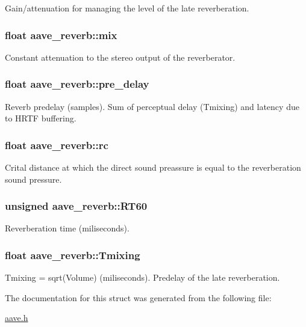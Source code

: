 Gain/attenuation for managing the level of the late reverberation. \hypertarget{structaave__reverb_a1d02d0947a2ba910470d895e03e210d4}{
\subsubsection[{mix}]{\setlength{\rightskip}{0pt plus 5cm}float aave\-\_\-reverb\-::mix}}\label{structaave__reverb_a1d02d0947a2ba910470d895e03e210d4}
Constant attenuation to the stereo output of the reverberator. \hypertarget{structaave__reverb_a338401b5113dcb382637d43dba5f4aa5}{
\subsubsection[{pre\-\_\-delay}]{\setlength{\rightskip}{0pt plus 5cm}float aave\-\_\-reverb\-::pre\-\_\-delay}}\label{structaave__reverb_a338401b5113dcb382637d43dba5f4aa5}
Reverb predelay (samples). Sum of perceptual delay (Tmixing) and latency due to H\-R\-T\-F buffering. \hypertarget{structaave__reverb_a2bc62b21b9ba27d56575f7ddbf23ff89}{
\subsubsection[{rc}]{\setlength{\rightskip}{0pt plus 5cm}float aave\-\_\-reverb\-::rc}}\label{structaave__reverb_a2bc62b21b9ba27d56575f7ddbf23ff89}
Crital distance at which the direct sound preassure is equal to the reverberation sound pressure. \hypertarget{structaave__reverb_a61f593c67c5e0ac18c2255c3c0830bc1}{
\subsubsection[{R\-T60}]{\setlength{\rightskip}{0pt plus 5cm}unsigned aave\-\_\-reverb\-::\-R\-T60}}\label{structaave__reverb_a61f593c67c5e0ac18c2255c3c0830bc1}
Reverberation time (miliseconds). \hypertarget{structaave__reverb_aa650231c06910bb5e352682b1bd6bd19}{
\subsubsection[{Tmixing}]{\setlength{\rightskip}{0pt plus 5cm}float aave\-\_\-reverb\-::\-Tmixing}}\label{structaave__reverb_aa650231c06910bb5e352682b1bd6bd19}
Tmixing = sqrt(\-Volume) (miliseconds). Predelay of the late reverberation. 

The documentation for this struct was generated from the following file\-:\begin{DoxyCompactItemize}
\item 
\hyperlink{aave_8h}{aave.\-h}\end{DoxyCompactItemize}
